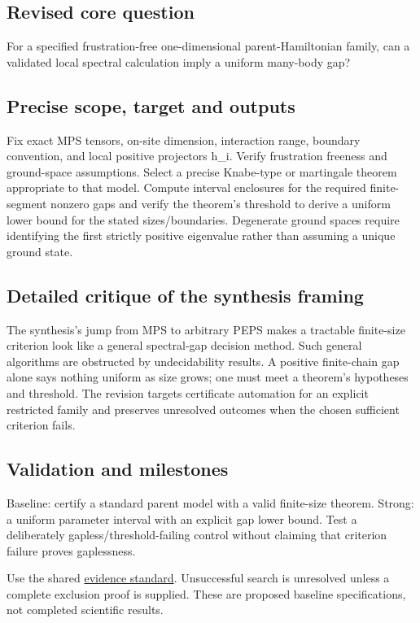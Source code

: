 \documentclass[
  11pt,
]{article}
\begin{document}
\subsection{Revised core question}

For a specified frustration-free one-dimensional parent-Hamiltonian
family, can a validated local spectral calculation imply a uniform
many-body gap?

\subsection{Precise scope, target and outputs}

Fix exact MPS tensors, on-site dimension, interaction range, boundary
convention, and local positive projectors h\_i. Verify frustration
freeness and ground-space assumptions. Select a precise Knabe-type or
martingale theorem appropriate to that model. Compute interval
enclosures for the required finite-segment nonzero gaps and verify the
theorem's threshold to derive a uniform lower bound for the stated
sizes/boundaries. Degenerate ground spaces require identifying the first
strictly positive eigenvalue rather than assuming a unique ground state.

\subsection{Detailed critique of the synthesis framing}

The synthesis's jump from MPS to arbitrary PEPS makes a tractable
finite-size criterion look like a general spectral-gap decision method.
Such general algorithms are obstructed by undecidability results. A
positive finite-chain gap alone says nothing uniform as size grows; one
must meet a theorem's hypotheses and threshold. The revision targets
certificate automation for an explicit restricted family and preserves
unresolved outcomes when the chosen sufficient criterion fails.

\subsection{Validation and milestones}

Baseline: certify a standard parent model with a valid finite-size
theorem. Strong: a uniform parameter interval with an explicit gap lower
bound. Test a deliberately gapless/threshold-failing control without
claiming that criterion failure proves gaplessness.

Use the shared
\href{https://github.com/rick-stevens-ai/Pure-Thought/blob/main/reviews/EVIDENCE-STANDARD.md}{evidence
standard}. Unsuccessful search is unresolved unless a complete exclusion
proof is supplied. These are proposed baseline specifications, not
completed scientific results.
\end{document}
